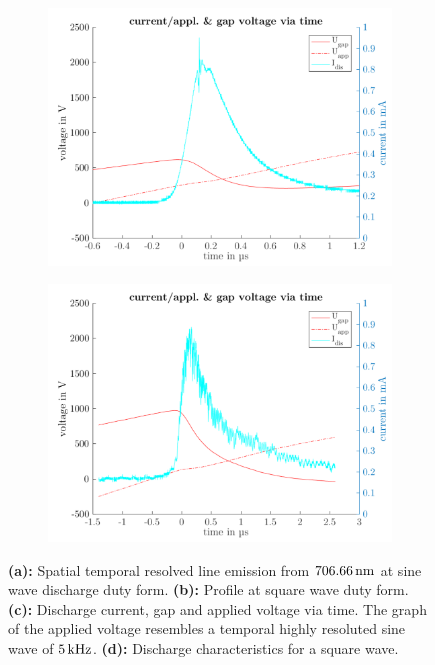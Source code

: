 \documentclass[a4paper,10pt]{article}
\newcommand{\fett}[1]{\textbf{#1}}
\begin{document}
\begin{figure}[h]
					\begin{subfigure}[b]{0.49\textwidth}
						\includegraphics[width=\textwidth]{figures/results/spatialtemporalresolvedlineintensity/sine/current_dis.pdf}
						\label{img:currentdissine}
						\vspace{-0.5cm}\caption{}
					\end{subfigure}
					\hfill
					\begin{subfigure}[b]{0.49\textwidth}
						\includegraphics[width=\textwidth]{figures/results/spatialtemporalresolvedlineintensity/square/current_dis.pdf}
						\label{img:currentdissquare}
						\vspace{-0.5cm}\caption{}
					\end{subfigure}
					
					\caption{\fett{(a):} Spatial temporal resolved line emission from $\unit[706.66]{nm}$ at sine wave discharge duty form. \fett{(b):} Profile at square wave duty form. \fett{(c):} Discharge current, gap and applied voltage via time. The graph of the applied voltage resembles a temporal highly resoluted sine wave of $\unit[5]{kHz}$. \fett{(d):} Discharge characteristics for a square wave.}
				\end{figure}
				
\end{document}
